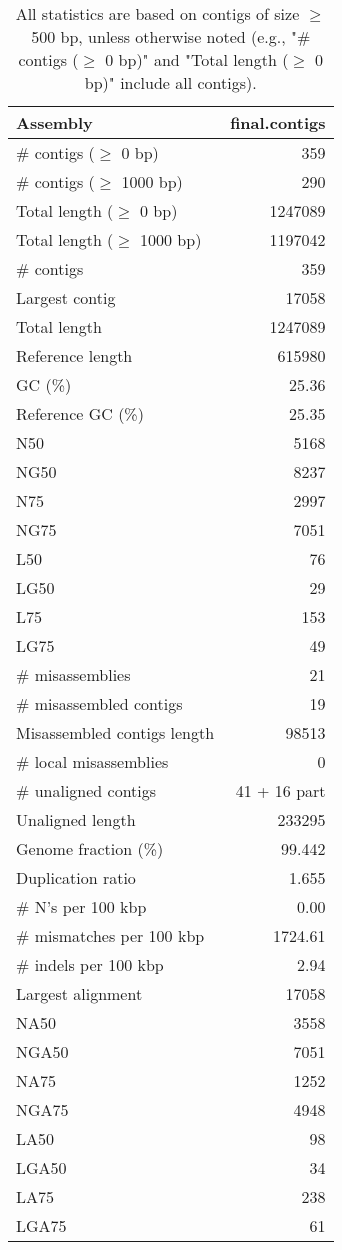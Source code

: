 \documentclass[12pt,a4paper]{article}
\begin{document}
\begin{table}[ht]
\begin{center}
\caption{All statistics are based on contigs of size $\geq$ 500 bp, unless otherwise noted (e.g., "\# contigs ($\geq$ 0 bp)" and "Total length ($\geq$ 0 bp)" include all contigs).}
\begin{tabular}{|l*{1}{|r}|}
\hline
Assembly & final.contigs \\ \hline
\# contigs ($\geq$ 0 bp) & 359 \\ \hline
\# contigs ($\geq$ 1000 bp) & 290 \\ \hline
Total length ($\geq$ 0 bp) & 1247089 \\ \hline
Total length ($\geq$ 1000 bp) & 1197042 \\ \hline
\# contigs & 359 \\ \hline
Largest contig & 17058 \\ \hline
Total length & 1247089 \\ \hline
Reference length & 615980 \\ \hline
GC (\%) & 25.36 \\ \hline
Reference GC (\%) & 25.35 \\ \hline
N50 & 5168 \\ \hline
NG50 & 8237 \\ \hline
N75 & 2997 \\ \hline
NG75 & 7051 \\ \hline
L50 & 76 \\ \hline
LG50 & 29 \\ \hline
L75 & 153 \\ \hline
LG75 & 49 \\ \hline
\# misassemblies & 21 \\ \hline
\# misassembled contigs & 19 \\ \hline
Misassembled contigs length & 98513 \\ \hline
\# local misassemblies & 0 \\ \hline
\# unaligned contigs & 41 + 16 part \\ \hline
Unaligned length & 233295 \\ \hline
Genome fraction (\%) & 99.442 \\ \hline
Duplication ratio & 1.655 \\ \hline
\# N's per 100 kbp & 0.00 \\ \hline
\# mismatches per 100 kbp & 1724.61 \\ \hline
\# indels per 100 kbp & 2.94 \\ \hline
Largest alignment & 17058 \\ \hline
NA50 & 3558 \\ \hline
NGA50 & 7051 \\ \hline
NA75 & 1252 \\ \hline
NGA75 & 4948 \\ \hline
LA50 & 98 \\ \hline
LGA50 & 34 \\ \hline
LA75 & 238 \\ \hline
LGA75 & 61 \\ \hline
\end{tabular}
\end{center}
\end{table}
\end{document}
